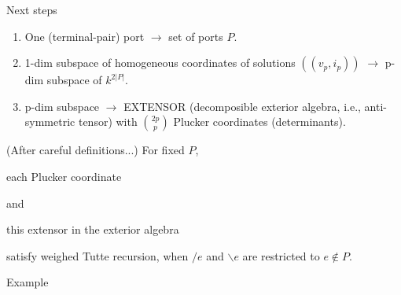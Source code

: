 \documentclass{beamer}
\begin{document}
\begin{frame}{Next steps}
\begin{enumerate}
\item One (terminal-pair) port $\rightarrow$ set of ports $P$.
\item 1-dim subspace of homogeneous coordinates of solutions
$((v_p, i_p))$ $\rightarrow$ p-dim subspace of $k^{2|P|}$.
\item p-dim subspace $\rightarrow$ EXTENSOR (decomposible
exterior algebra, i.e., anti-symmetric tensor) with $\binom{2p}{p}$ Plucker
coordinates (determinants).
\end{enumerate}
\begin{theorem}
(After careful definitions...) For fixed $P$,\\
\begin{center}
\hfill
\begin{minipage}{0.80in}
each Plucker coordinate
\end{minipage}
\hfill
and
\hfill
\begin{minipage}{1.7in}
this extensor in the exterior algebra
\end{minipage}
\hfill
\end{center}
satisfy weighed Tutte recursion, when $/e$ and $\backslash e$
are restricted to $e\not\in P$.
\end{theorem}
\end{frame}




\begin{frame}{Example}

\end{frame}
\end{document}
